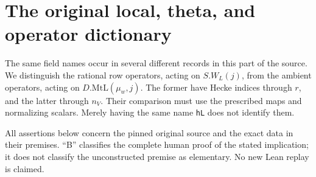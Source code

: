 \section{The original local, theta, and operator dictionary}
\label{sec:local-theta-dictionary}


The same field names occur in several different records in this part of
the source.  We distinguish the rational row operators, acting on
\(S.W_L(j)\), from the ambient operators, acting on
\(D.\mathrm{MtL}(\mu_w,j)\).  The former have Hecke indices through
\(r\), and the latter through \(n_V\).  Their comparison must use
the prescribed maps and normalizing scalars.  Merely having the same
name \texttt{hL} does not identify them.

All assertions below concern the pinned original source and the exact
data in their premises.  ``B'' classifies the complete human proof of
the stated implication; it does not classify the unconstructed premise
as elementary.  No new Lean replay is claimed.

